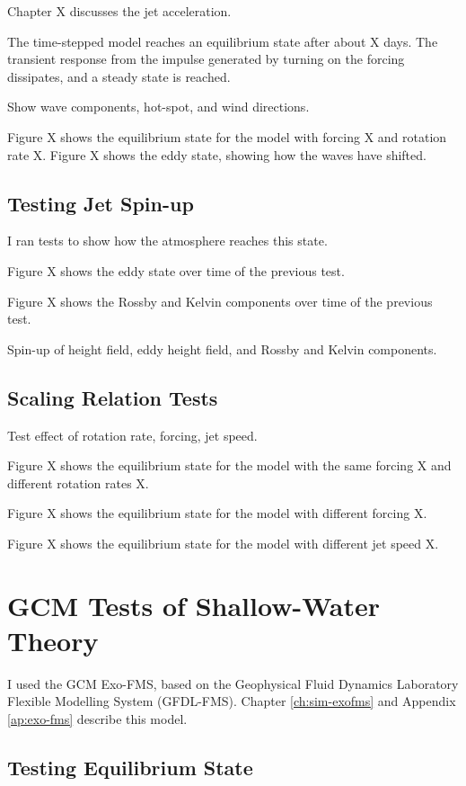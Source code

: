 Chapter X discusses the jet acceleration.

The time-stepped model reaches an equilibrium state after about X days. The transient response from the impulse generated by turning on the forcing dissipates, and a steady state is reached.

Show wave components, hot-spot, and wind directions.

Figure X shows the equilibrium state for the model with forcing X and rotation rate X. Figure X shows the eddy state, showing how the waves have shifted.


\subsection*{Testing Jet Spin-up}

I ran tests to show how the atmosphere reaches this state.

Figure X shows the eddy state over time of the previous test.

Figure X shows the Rossby and Kelvin components over time of the previous test.

Spin-up of height field, eddy height field, and Rossby and Kelvin components.


\subsection*{Scaling Relation Tests}

Test effect of rotation rate, forcing, jet speed.

Figure X shows the equilibrium state for the model with the same forcing X and different rotation rates X.

Figure X shows the equilibrium state for the model with different forcing X.

Figure X shows the equilibrium state for the model with different jet speed X.

\section{GCM Tests of Shallow-Water Theory}

I used the GCM Exo-FMS, based on the Geophysical Fluid Dynamics Laboratory Flexible Modelling System (GFDL-FMS). Chapter \ref{ch:sim-exofms} and Appendix \ref{ap:exo-fms} describe this model.

\subsection*{Testing Equilibrium State}


